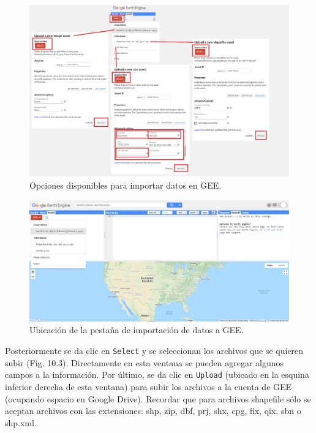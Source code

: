 \documentclass[
  12pt,
  letterpaper,
  twoside]{book}
\begin{document}
\begin{figure}[btp]

{\centering \includegraphics[width=1\linewidth]{Img/newAssets} 

}

\caption{Opciones disponibles para importar datos en GEE.}\label{fig:unnamed-chunk-171}
\end{figure}

\begin{figure}[btp]

{\centering \includegraphics[width=1\linewidth]{Img/Asset1} 

}

\caption{Ubicación de la pestaña de importación de datos a GEE.}\label{fig:unnamed-chunk-172}
\end{figure}

Posteriormente se da clic en \texttt{Select} y se seleccionan los archivos que se quieren subir (Fig. 10.3). Directamente en esta ventana se pueden agregar algunos campos a la información. Por último, se da clic en \texttt{Upload} (ubicado en la esquina inferior derecha de esta ventana) para subir los archivos a la cuenta de GEE (ocupando espacio en Google Drive). Recordar que para archivos shapefile sólo se aceptan archivos con las extensiones: shp, zip, dbf, prj, shx, cpg, fix, qix, sbn o shp.xml.
\end{document}
